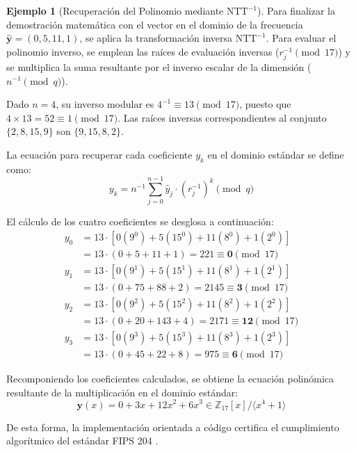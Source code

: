 \documentclass[11pt, a4paper]{report}
\theoremstyle{definition}
\newtheorem{ejemplo}{Ejemplo}[chapter]
\begin{document}
\begin{ejemplo}[Recuperación del Polinomio mediante $\text{NTT}^{-1}$]
Para finalizar la demostración matemática con el vector en el dominio de la frecuencia $\hat{\mathbf{y}} = (0, 5, 11, 1)$, se aplica la transformación inversa $\text{NTT}^{-1}$. Para evaluar el polinomio inverso, se emplean las raíces de evaluación inversas ($r_j^{-1} \pmod{17}$) y se multiplica la suma resultante por el inverso escalar de la dimensión ($n^{-1} \pmod q$).

Dado $n=4$, su inverso modular es $4^{-1} \equiv 13 \pmod{17}$, puesto que $4 \times 13 = 52 \equiv 1 \pmod{17}$. Las raíces inversas correspondientes al conjunto $\{2, 8, 15, 9\}$ son $\{9, 15, 8, 2\}$.

La ecuación para recuperar cada coeficiente $y_k$ en el dominio estándar se define como:
$$y_k = n^{-1} \sum_{j=0}^{n-1} \hat{y}_j \cdot (r_j^{-1})^k \pmod q$$

El cálculo de los cuatro coeficientes se desglosa a continuación:
\begin{align*}
    y_0 &= 13 \cdot [0(9^0) + 5(15^0) + 11(8^0) + 1(2^0)] \\
        &= 13 \cdot (0 + 5 + 11 + 1) = 221 \equiv \mathbf{0} \pmod{17} \\[1ex]
    y_1 &= 13 \cdot [0(9^1) + 5(15^1) + 11(8^1) + 1(2^1)] \\
        &= 13 \cdot (0 + 75 + 88 + 2) = 2145 \equiv \mathbf{3} \pmod{17} \\[1ex]
    y_2 &= 13 \cdot [0(9^2) + 5(15^2) + 11(8^2) + 1(2^2)] \\
        &= 13 \cdot (0 + 20 + 143 + 4) = 2171 \equiv \mathbf{12} \pmod{17} \\[1ex]
    y_3 &= 13 \cdot [0(9^3) + 5(15^3) + 11(8^3) + 1(2^3)] \\
        &= 13 \cdot (0 + 45 + 22 + 8) = 975 \equiv \mathbf{6} \pmod{17}
\end{align*}

Recomponiendo los coeficientes calculados, se obtiene la ecuación polinómica resultante de la multiplicación en el dominio estándar:
\begin{equation}
    \mathbf{y}(x) = 0 + 3x + 12x^2 + 6x^3 \in \mathbb{Z}_{17}[x] / \langle x^4 + 1 \rangle
\end{equation}

De esta forma, la implementación orientada a código certifica el cumplimiento algorítmico del estándar FIPS 204 \cite{nist_fips204}.
\end{ejemplo}
\end{document}
